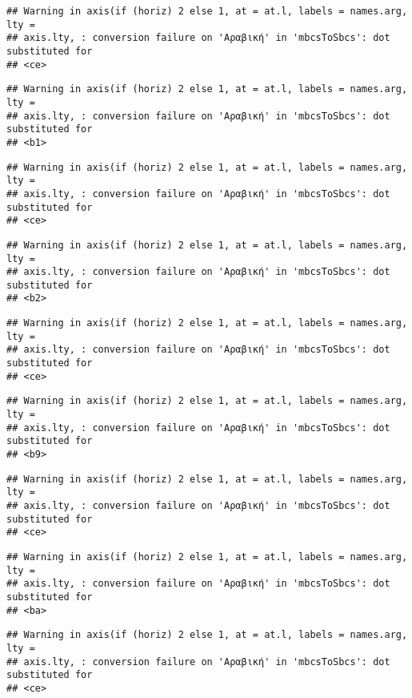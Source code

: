 \documentclass[
]{article}
\begin{document}
\begin{verbatim}
## Warning in axis(if (horiz) 2 else 1, at = at.l, labels = names.arg, lty =
## axis.lty, : conversion failure on 'Αραβική' in 'mbcsToSbcs': dot substituted for
## <ce>
\end{verbatim}

\begin{verbatim}
## Warning in axis(if (horiz) 2 else 1, at = at.l, labels = names.arg, lty =
## axis.lty, : conversion failure on 'Αραβική' in 'mbcsToSbcs': dot substituted for
## <b1>
\end{verbatim}

\begin{verbatim}
## Warning in axis(if (horiz) 2 else 1, at = at.l, labels = names.arg, lty =
## axis.lty, : conversion failure on 'Αραβική' in 'mbcsToSbcs': dot substituted for
## <ce>
\end{verbatim}

\begin{verbatim}
## Warning in axis(if (horiz) 2 else 1, at = at.l, labels = names.arg, lty =
## axis.lty, : conversion failure on 'Αραβική' in 'mbcsToSbcs': dot substituted for
## <b2>
\end{verbatim}

\begin{verbatim}
## Warning in axis(if (horiz) 2 else 1, at = at.l, labels = names.arg, lty =
## axis.lty, : conversion failure on 'Αραβική' in 'mbcsToSbcs': dot substituted for
## <ce>
\end{verbatim}

\begin{verbatim}
## Warning in axis(if (horiz) 2 else 1, at = at.l, labels = names.arg, lty =
## axis.lty, : conversion failure on 'Αραβική' in 'mbcsToSbcs': dot substituted for
## <b9>
\end{verbatim}

\begin{verbatim}
## Warning in axis(if (horiz) 2 else 1, at = at.l, labels = names.arg, lty =
## axis.lty, : conversion failure on 'Αραβική' in 'mbcsToSbcs': dot substituted for
## <ce>
\end{verbatim}

\begin{verbatim}
## Warning in axis(if (horiz) 2 else 1, at = at.l, labels = names.arg, lty =
## axis.lty, : conversion failure on 'Αραβική' in 'mbcsToSbcs': dot substituted for
## <ba>
\end{verbatim}

\begin{verbatim}
## Warning in axis(if (horiz) 2 else 1, at = at.l, labels = names.arg, lty =
## axis.lty, : conversion failure on 'Αραβική' in 'mbcsToSbcs': dot substituted for
## <ce>
\end{verbatim}
\end{document}

